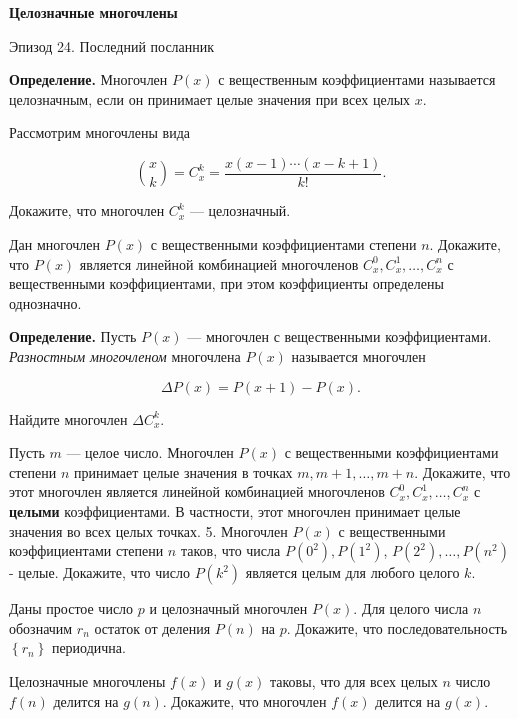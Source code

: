 \centerline{\bf \Huge Целозначные многочлены}

\begin{flushright}
        \scriptsize{Эпизод 24. Последний посланник}
\end{flushright}

\textbf{Определение.}
Многочлен $P(x)$ с вещественным коэффициентами называется целозначным, если он принимает целые значения при всех целых $x$.

Рассмотрим многочлены вида

$$
\binom{x}{k}=C_x^k=\frac{x(x-1) \cdots(x-k+1)}{k!} .
$$


Докажите, что многочлен $C_x^k$ --- целозначный.

Дан многочлен $P(x)$ с вещественными коэффициентами степени $n$. Докажите, что $P(x)$ является линейной комбинацией многочленов $C_x^0, C_x^1, \ldots, C_x^n$ с вещественными коэффициентами, при этом коэффициенты определены однозначно.

\textbf{Определение.}
Пусть $P(x)$ --- многочлен с вещественными коэффициентами. \textit{Разностным многочленом} многочлена $P(x)$ называется многочлен

$$
\Delta P(x)=P(x+1)-P(x) .
$$


Найдите многочлен $\Delta C_x^k$.

Пусть $m$ --- целое число. Многочлен $P(x)$ с вещественными коэффициентами степени $n$ принимает целые значения в точках $m, m+1, \ldots, m+n$. Докажите, что этот многочлен является линейной комбинацией многочленов $C_x^0, C_x^1, \ldots, C_x^n$ с \textbf{целыми} коэффициентами. В частности, этот многочлен принимает целые значения во всех целых точках.
5. Многочлен $P(x)$ с вещественными коэффициентами степени $n$ таков, что числа $P\left(0^2\right), P\left(1^2\right)$, $P\left(2^2\right), \ldots, P\left(n^2\right)$ - целые. Докажите, что число $P\left(k^2\right)$ является целым для любого целого $k$.

Даны простое число $p$ и целозначный многочлен $P(x)$. Для целого числа $n$ обозначим $r_n$ остаток от деления $P(n)$ на $p$. Докажите, что последовательность $\left\{r_n\right\}$ периодична.

Целозначные многочлены $f(x)$ и $g(x)$ таковы, что для всех целых $n$ число $f(n)$ делится на $g(n)$. Докажите, что многочлен $f(x)$ делится на $g(x)$.
